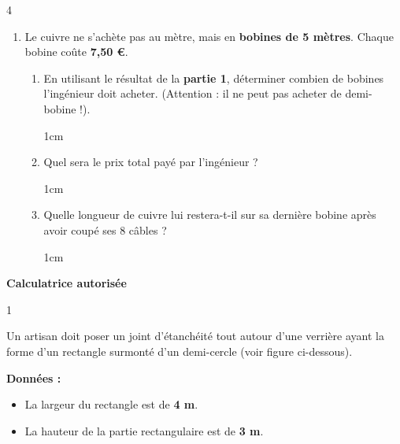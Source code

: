 \documentclass[a4paper]{book}
\begin{document}
{\begin{exerciceNote}{4}
\begin{enumerate}[leftmargin=*]
            Quelle masse de métal reste-t-il sous forme de chutes ?

            \begin{ZoneReponse}{2cm}
            \end{ZoneReponse}

            \item Le cuivre ne s'achète pas au mètre, mais en \textbf{bobines de 5 mètres}. Chaque bobine coûte \textbf{7,50 €}.
            \begin{enumerate}[leftmargin=*]
                \item En utilisant le résultat de la \textbf{partie 1}, déterminer combien de bobines l'ingénieur doit acheter. (Attention : il ne peut pas acheter de demi-bobine !).
                
                \begin{ZoneReponse}{1cm}
                \end{ZoneReponse}
                
                \item Quel sera le prix total payé par l'ingénieur ?

                \begin{ZoneReponse}{1cm}
                \end{ZoneReponse}
                
                \item Quelle longueur de cuivre lui restera-t-il sur sa dernière bobine après avoir coupé ses 8 câbles ?

                \begin{ZoneReponse}{1cm}
                \end{ZoneReponse}
            \end{enumerate}
        \end{enumerate}
    \end{exerciceNote}

\newpage

\raggedright
\NomPrenom  \hfill \textbf{Calculatrice autorisée}


    \begin{exerciceNote}{1}
        \begin{minipage}{0.6\linewidth}
            Un artisan doit poser un joint d'étanchéité tout autour d'une verrière ayant la forme d'un rectangle surmonté d'un demi-cercle (voir figure ci-dessous).
        
            \textbf{Données :}
            \begin{itemize}
                \item La largeur du rectangle est de \textbf{4 m}.
                \item La hauteur de la partie rectangulaire est de \textbf{3 m}.
            \end{itemize}
        

\end{minipage}
\end{exerciceNote}}
\end{document}
